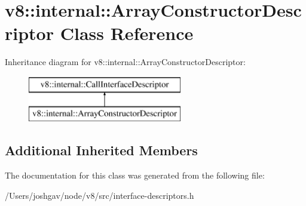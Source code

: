 \hypertarget{classv8_1_1internal_1_1_array_constructor_descriptor}{}\section{v8\+:\+:internal\+:\+:Array\+Constructor\+Descriptor Class Reference}
\label{classv8_1_1internal_1_1_array_constructor_descriptor}
Inheritance diagram for v8\+:\+:internal\+:\+:Array\+Constructor\+Descriptor\+:\begin{figure}[H]
\begin{center}
\leavevmode
\includegraphics[height=2.000000cm]{classv8_1_1internal_1_1_array_constructor_descriptor}
\end{center}
\end{figure}
\subsection*{Additional Inherited Members}


The documentation for this class was generated from the following file\+:\begin{DoxyCompactItemize}
\item 
/\+Users/joshgav/node/v8/src/interface-\/descriptors.\+h\end{DoxyCompactItemize}
